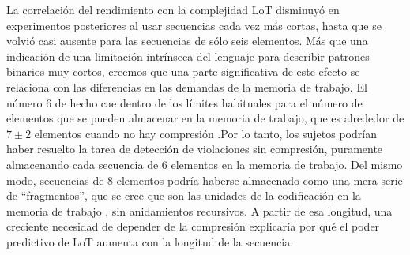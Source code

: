 La correlación del rendimiento con la complejidad LoT disminuyó en experimentos posteriores al usar secuencias cada vez más cortas, hasta que se volvió casi ausente para las secuencias de sólo seis elementos. Más que una indicación de una limitación intrínseca del lenguaje para describir patrones binarios muy cortos, creemos que una parte significativa de este efecto se relaciona con las diferencias en las demandas de la memoria de trabajo. El número 6 de hecho cae dentro de los límites habituales para el número de elementos que se pueden almacenar en la memoria de trabajo, que es alrededor de $7 \pm 2$ elementos cuando no hay compresión \cite{f16,f29}.Por lo tanto, los sujetos podrían haber resuelto la tarea de detección de violaciones sin compresión, puramente almacenando cada secuencia de 6 elementos en la memoria de trabajo. Del mismo modo, secuencias de 8 elementos podría haberse almacenado como una mera serie de ``fragmentos'', que se cree que son las unidades de la codificación en la memoria de trabajo \cite{f16,f86,f108,f109}, sin anidamientos recursivos. A partir de esa longitud, una creciente necesidad de depender de la compresión explicaría por qué el poder predictivo de LoT aumenta con la longitud de la secuencia.


